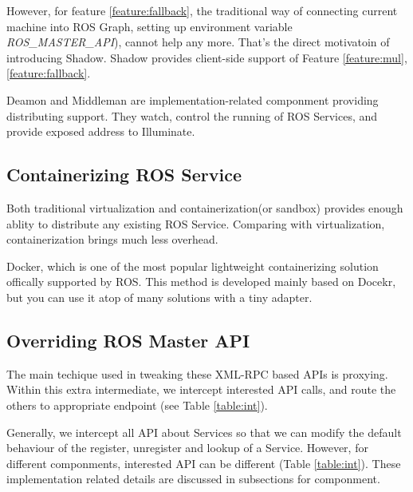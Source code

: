 However, for feature \ref{feature:fallback}, the traditional way of connecting current machine into ROS Graph,
setting up environment variable \emph{ROS\_MASTER\_API}), cannot help any more.
That's the direct motivatoin of introducing Shadow.
Shadow provides client-side support of Feature \ref{feature:mul}, \ref{feature:fallback}. 

Deamon and Middleman are implementation-related componment providing distributing support.
They watch, control the running of ROS Services, and provide exposed address to Illuminate.

\subsection{Containerizing ROS Service}
Both traditional virtualization and containerization(or sandbox) provides enough ablity to distribute any existing ROS Service.
Comparing with virtualization, containerization brings much less overhead. %

Docker, which is one of the most popular lightweight containerizing solution offically supported by ROS.
This method is developed mainly based on Docekr, but you can use it atop of many solutions with a tiny adapter. 


\subsection{Overriding ROS Master API}
The main techique used in tweaking these XML-RPC based APIs is proxying.
Within this extra intermediate, we intercept interested API calls,
and route the others to appropriate endpoint (see Table \ref{table:int}).

Generally, we intercept all API about Services so that we can modify the default behaviour of the register,
unregister and lookup of a Service.
However, for different componments, interested API can be different (Table \ref{table:int}).
These implementation related details are discussed in subsections for componment.
 
